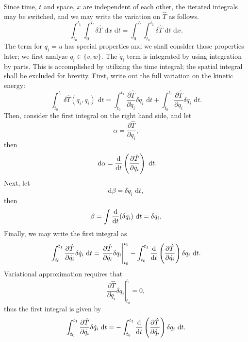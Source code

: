 Since time, $t$ and space, $x$ are independent of each other, the iterated integrals may be switched, and we may write the variation on $\hat T$ as follows.
\begin{equation}
\int_{t_0}^{t_1}\int_0^L\delta\hat T\text{ d}x\text{ d}t = \int_0^L\int_{t_0}^{t_1}\delta\hat T\text{ d}t\text{ d}x.
\end{equation}
The term for $q_i=u$ has special properties and we shall consider those properties later; we first analyze $q_i\in\{v,w\}$. The $\dot q_i$ term is integrated by using integration by parts. This is accomplished by utilizing the time integral; the spatial integral shall be excluded for brevity.
First, write out the full variation on the kinetic energy:
\begin{equation}
\int_{t_0}^{t_1}\delta\hat T(\dot q_i,q_i)\text{ d}t = \int_{t_0}^{t_1}\frac{\partial\hat T}{\partial \dot q_i}\delta \dot q_i\text{ d}t+\int_{t_0}^{t_1}\frac{\partial\hat T}{\partial q_i}\delta q_i\text{ d}t.
\label{eq:kin.variation}
\end{equation}
Then, consider the first integral on the right hand side, and let
\begin{equation}
\alpha = \frac{\partial\hat T}{\partial \dot q_i},
\end{equation}
then
\begin{equation}
\text{ d}\alpha = \frac{\text d}{\text dt}\left(\frac{\partial\hat T}{\partial \dot q_i}\right)\text{ d}t.
\end{equation}
Next, let
\begin{equation}
\text{d}\beta = \delta \dot q_i\text{ d}t,
\end{equation}
then
\begin{equation}
\beta = \int \frac{\text d}{\text dt}(\delta q_i)\text{ d}t = \delta q_i.
\end{equation}
Finally, we may write the first integral as
\begin{equation}
\int_{t_0}^{t_1}\frac{\partial\hat T}{\partial \dot q_i}\delta \dot q_i\text{ d}t = \left.\frac{\partial\hat T}{\partial \dot q_i}\delta q_i\right |_{t_0}^{t_1}-\int_{t_0}^{t_1}\frac{\text d}{\text dt}\left(\frac{\partial\hat T}{\partial \dot q_i}\right)\delta q_i\text{ d}t.
\end{equation}
Variational approximation requires that
\begin{equation}
\left.\frac{\partial\hat T}{\partial \dot q_i}\delta q_i\right |_{t_0}^{t_1} = 0,
\end{equation}
thus the first integral is given by
\begin{equation}
\int_{t_0}^{t_1}\frac{\partial\hat T}{\partial \dot q_i}\delta \dot q_i\text{ d}t = -\int_{t_0}^{t_1}\frac{\text d}{\text dt}\left(\frac{\partial\hat T}{\partial \dot q_i}\right)\delta q_i\text{ d}t.
\label{eq:kin.variation.byparts}
\end{equation}
